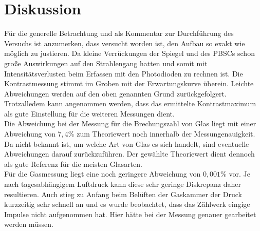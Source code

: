 \section{Diskussion}
Für die generelle Betrachtung und als Kommentar zur Durchführung des Versuchs ist anzumerken, dass
versucht worden ist, den Aufbau so exakt wie möglich zu justieren.
Da kleine Verrückungen der Spiegel und des PBSCs schon große Auswirkungen auf den Strahlengang hatten und somit mit
Intensitätsverlusten beim Erfassen mit den Photodioden zu rechnen ist.
Die Kontrastmessung stimmt im Groben mit der Erwartungskurve überein.
Leichte Abweichungen werden auf den oben genannten Grund zurückgefolgert.
Trotzalledem kann angenommen werden, dass das ermittelte Kontrastmaximum als gute Einstellung für die weiteren Messungen dient.\\
Die Abweichung bei der Messung für die Brechungszahl von Glas liegt mit einer Abweichung von $7,4 \%$ zum Theoriewert noch innerhalb der Messungenauigkeit.
Da nicht bekannt ist, um welche Art von Glas es sich handelt, sind eventuelle Abweichungen darauf zurückzuführen.
Der gewählte Theoriewert dient dennoch als gute Referenz für die meisten Glasarten.\\
Für die Gasmessung liegt eine noch geringere Abweichung von $0,001\%$ vor.
Je nach tagesabhängigem Luftdruck kann diese sehr geringe Diskrepanz daher resultieren.
Auch stieg zu Anfang beim Belüften der Gaskammer der Druck kurzzeitig sehr schnell an und es wurde beobachtet, dass das Zählwerk eingige Impulse nicht aufgenommen hat.
Hier hätte bei der Messung genauer gearbeitet werden müssen.

